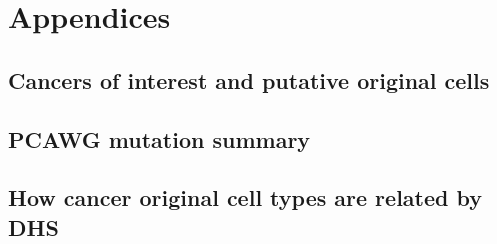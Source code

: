 \newpage
\setcounter{table}{0}
\setcounter{figure}{0}
\setcounter{section}{0}
\renewcommand\thesection{A.\arabic{section}} 
\renewcommand\thefigure{A\arabic{figure}} 
\renewcommand\thetable{A\arabic{table}} 

\chapter*{Appendices}

\section{Cancers of interest and putative original cells}


\section{PCAWG mutation summary}
\vspace{1cm}

\vspace{2cm}


\newpage
\section{How cancer original cell types are related by DHS}


